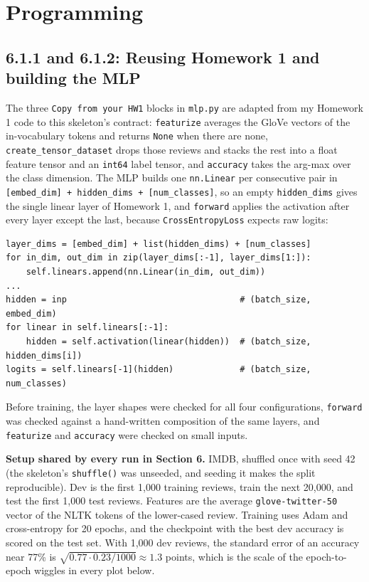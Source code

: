 \section{Programming}

\subsection*{6.1.1 and 6.1.2: Reusing Homework 1 and building the MLP}
The three \texttt{Copy from your HW1} blocks in \texttt{mlp.py} are adapted from my Homework 1 code to this skeleton's contract: \texttt{featurize} averages the GloVe vectors of the in-vocabulary tokens and returns \texttt{None} when there are none, \texttt{create\_tensor\_dataset} drops those reviews and stacks the rest into a float feature tensor and an \texttt{int64} label tensor, and \texttt{accuracy} takes the arg-max over the class dimension. The MLP builds one \texttt{nn.Linear} per consecutive pair in \texttt{[embed\_dim] + hidden\_dims + [num\_classes]}, so an empty \texttt{hidden\_dims} gives the single linear layer of Homework 1, and \texttt{forward} applies the activation after every layer except the last, because \texttt{CrossEntropyLoss} expects raw logits:
\begin{verbatim}
layer_dims = [embed_dim] + list(hidden_dims) + [num_classes]
for in_dim, out_dim in zip(layer_dims[:-1], layer_dims[1:]):
    self.linears.append(nn.Linear(in_dim, out_dim))
...
hidden = inp                                  # (batch_size, embed_dim)
for linear in self.linears[:-1]:
    hidden = self.activation(linear(hidden))  # (batch_size, hidden_dims[i])
logits = self.linears[-1](hidden)             # (batch_size, num_classes)
\end{verbatim}
Before training, the layer shapes were checked for all four configurations, \texttt{forward} was checked against a hand-written composition of the same layers, and \texttt{featurize} and \texttt{accuracy} were checked on small inputs.

\textbf{Setup shared by every run in Section 6.} IMDB, shuffled once with seed 42 (the skeleton's \texttt{shuffle()} was unseeded, and seeding it makes the split reproducible). Dev is the first 1{,}000 training reviews, train the next 20{,}000, and test the first 1{,}000 test reviews. Features are the average \texttt{glove-twitter-50} vector of the NLTK tokens of the lower-cased review. Training uses Adam and cross-entropy for 20 epochs, and the checkpoint with the best dev accuracy is scored on the test set. With 1{,}000 dev reviews, the standard error of an accuracy near 77\% is $\sqrt{0.77\cdot0.23/1000}\approx1.3$ points, which is the scale of the epoch-to-epoch wiggles in every plot below.

